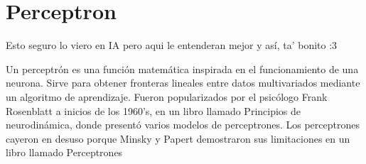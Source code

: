 \section{Perceptron}

Esto seguro lo viero en IA pero aqui le entenderan mejor y así, ta' bonito :3

Un perceptrón es una función matemática inspirada en el funcionamiento de una
neurona.
Sirve para obtener fronteras lineales entre datos multivariados mediante un
algoritmo de aprendizaje.
Fueron popularizados por el psicólogo Frank Rosenblatt a inicios de los 1960’s, en
un libro llamado Principios de neurodinámica, donde presentó varios modelos de
perceptrones.
Los perceptrones cayeron en desuso porque Minsky y Papert demostraron sus
limitaciones en un libro llamado Perceptrones
